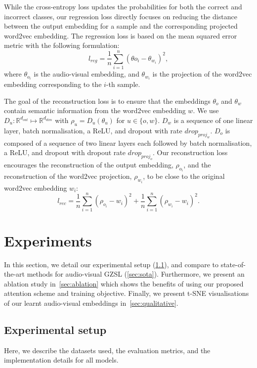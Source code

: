 \documentclass[runningheads]{llncs}
\newcommand{\mypara}[1]{\noindent{\bf{#1}}}
\begin{document}
\mypara{Regression loss.}
 While the cross-entropy loss updates the probabilities for both the correct and incorrect classes, our regression loss directly focuses on reducing the distance between the output embedding for a sample and the corresponding projected word2vec embedding. 
The regression loss is based on the mean squared error metric with the following formulation:
\begin{equation}\label{eq:reg_loss}
    l_{reg} = \frac{1}{n}\sum_{i=1}^n(\theta{o_{i}}-\theta_{w_{i}})^2,
\end{equation}
where $\theta_{o_{i}}$ is the audio-visual embedding, and $\theta_{w_{i}}$ is the projection of the word2vec embedding corresponding to the $i$-th sample.

\mypara{Reconstruction loss.}
The goal of the reconstruction loss is to ensure that the embeddings $\theta_{o}$ and $\theta_{w}$ contain semantic information from the word2vec embedding $w$. 
We use $D_{u}: \mathbb{R}^{d_{out}} \mapsto \mathbb{R}^{d_{dim}}$ with $\rho_{u}=D_{u}(\theta_u)$ for $u \in \{o,w\}$. $D_{w}$ is a sequence of one linear layer, batch normalisation, a ReLU, and dropout with rate $drop_{proj_w}$. $D_{o}$ is composed of a sequence of two linear layers each followed by batch normalisation, a ReLU, and dropout with dropout rate $drop_{proj_o}$.
Our reconstruction loss encourages the reconstruction of the output embedding, $\rho_{o_i}$, and the reconstruction of the word2vec projection, $\rho_{w_i}$, to be close to the original word2vec embedding $w_i$:
\begin{equation}\label{eq:pareto_mle2}
  l_{rec}=\frac{1}{n}\sum_{i=1}^n(\rho_{o_i}- w_i)^2+
  \frac{1}{n}\sum_{i=1}^n(\rho_{w_i}- w_i)^2.
\end{equation}


\section{Experiments}
In this section, we detail our experimental setup (\cref{sec:setup}), and compare to state-of-the-art methods for audio-visual GZSL (\cref{sec:sota}). Furthermore, we present an ablation study in~\cref{sec:ablation} which shows the benefits of using our proposed attention scheme and training objective. Finally, we present t-SNE visualisations of our learnt audio-visual embeddings in~\cref{sec:qualitative}.

\subsection{Experimental setup}\label{sec:setup}
Here, we describe the datasets used, the evaluation metrics, and the implementation details for all models.
\end{document}
